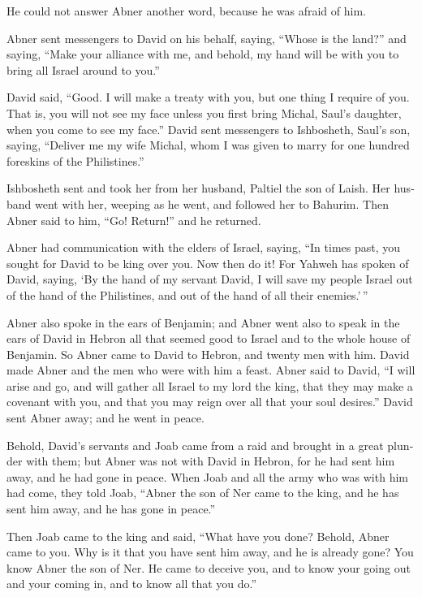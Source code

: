 \begin{paracol}{2}
\begin{otherlanguage}{english}
 He could not answer Abner another word, because he was
afraid of him.

 Abner sent messengers to David on his behalf, saying,
``Whose is the land?'' and saying, ``Make your alliance with me, and
behold, my hand will be with you to bring all Israel around to you.''

 David said, ``Good. I will make a treaty with you, but
one thing I require of you. That is, you will not see my face unless you
first bring Michal, Saul's daughter, when you come to see my face.''
 David sent messengers to Ishbosheth, Saul's son, saying,
``Deliver me my wife Michal, whom I was given to marry for one hundred
foreskins of the Philistines.''

 Ishbosheth sent and took her from her husband, Paltiel
the son of Laish.  Her husband went with her, weeping as
he went, and followed her to Bahurim. Then Abner said to him, ``Go!
Return!'' and he returned.

 Abner had communication with the elders of Israel,
saying, ``In times past, you sought for David to be king over you.
 Now then do it! For Yahweh has spoken of David, saying,
`By the hand of my servant David, I will save my people Israel out of
the hand of the Philistines, and out of the hand of all their
enemies.'\,''

 Abner also spoke in the ears of Benjamin; and Abner went
also to speak in the ears of David in Hebron all that seemed good to
Israel and to the whole house of Benjamin.  So Abner came
to David to Hebron, and twenty men with him. David made Abner and the
men who were with him a feast.  Abner said to David, ``I
will arise and go, and will gather all Israel to my lord the king, that
they may make a covenant with you, and that you may reign over all that
your soul desires.'' David sent Abner away; and he went in peace.

 Behold, David's servants and Joab came from a raid and
brought in a great plunder with them; but Abner was not with David in
Hebron, for he had sent him away, and he had gone in peace.
 When Joab and all the army who was with him had come,
they told Joab, ``Abner the son of Ner came to the king, and he has sent
him away, and he has gone in peace.''

 Then Joab came to the king and said, ``What have you
done? Behold, Abner came to you. Why is it that you have sent him away,
and he is already gone?  You know Abner the son of Ner.
He came to deceive you, and to know your going out and your coming in,
and to know all that you do.''


\end{otherlanguage}
\end{paracol}
